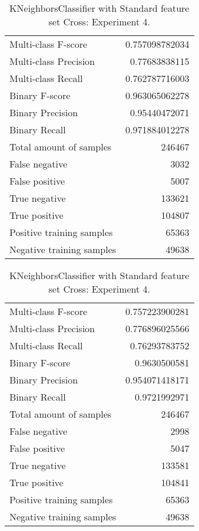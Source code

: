 \begin{table}[H]
\begin{minipage}{0.5\textwidth}
\caption{KNeighborsClassifier with Standard feature set Cross: Experiment 3.}
\centering
\begin{tabular}{l r}
\toprule
Multi-class F-score & 0.757098782034 \\
Multi-class Precision & 0.77683838115 \\
Multi-class Recall & 0.762787716003 \\
\midrule
Binary F-score & 0.963065062278 \\
Binary Precision & 0.95440472071 \\
Binary Recall & 0.971884012278 \\
\midrule
Total amount of samples & 246467 \\
False negative & 3032 \\
False positive & 5007 \\
True negative & 133621 \\
True positive & 104807 \\
\midrule
Positive training samples & 65363 \\
Negative training samples & 49638 \\
\bottomrule
\end{tabular}
\end{minipage}
\hfillx
\begin{minipage}{0.5\textwidth}
\caption{KNeighborsClassifier with Standard feature set Cross: Experiment 4.}
\centering
\begin{tabular}{l r}
\toprule
Multi-class F-score & 0.757223900281 \\
Multi-class Precision & 0.776896025566 \\
Multi-class Recall & 0.76293783752 \\
\midrule
Binary F-score & 0.9630500581 \\
Binary Precision & 0.954071418171 \\
Binary Recall & 0.9721992971 \\
\midrule
Total amount of samples & 246467 \\
False negative & 2998 \\
False positive & 5047 \\
True negative & 133581 \\
True positive & 104841 \\
\midrule
Positive training samples & 65363 \\
Negative training samples & 49638 \\
\bottomrule
\end{tabular}
\end{minipage}
\end{table}
